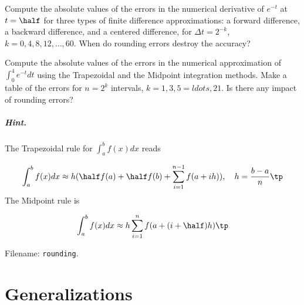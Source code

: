 \documentclass[graybox,sectrefs,envcountresetchap,open=right,final]{svmonodo}
\makeatletter
\newenvironment{doconceexercise}{}{}
\newcounter{doconceexercisecounter}%
\newcommand\listofexercises{
\chapter*{List of Exercises, Problems, and Projects
          \@mkboth{List of Exercises, Problems, and Projects}{List of Exercises, Problems, and Projects}}
\markboth{List of Exercises, Problems, and Projects}{List of Exercises, Problems, and Projects}
\@starttoc{loe}
}
\makeatother
\begin{document}
\begin{doconceexercise}

                
\label{decay:analysis:exer:rounding}

Compute the absolute values of the errors in the numerical derivative
of $e^{-t}$ at $t=\half$ for three types of finite difference
approximations: a forward difference, a backward difference, and
a centered difference, for $\Delta t = 2^{-k}$, $k=0,4, 8, 12, \ldots, 60$.
When do rounding errors destroy the accuracy?



Compute the absolute values of the errors in the numerical
approximation of $\int_0^4 e^{-t}dt$ using the Trapezoidal
and the Midpoint integration methods. Make a table of
the errors for $n=2^k$ intervals, $k=1,3,5=ldots,21$.
Is there any impact of rounding errors?


\paragraph{Hint.}
The Trapezoidal rule for $\int_a^bf(x)dx$ reads

\[ \int_a^bf(x)dx\approx h(\half f(a) + \half f(b) + \sum_{i=1}^{n-1}
f(a+ih)),\quad h = \frac{b-a}{n}\tp\]
The Midpoint rule is

\[ \int_a^bf(x)dx\approx h\sum_{i=1}^n f(a + (i+\half)h)\tp\]




\noindent Filename: \texttt{rounding}.

\end{doconceexercise}

\chapter{Generalizations}
\end{document}
